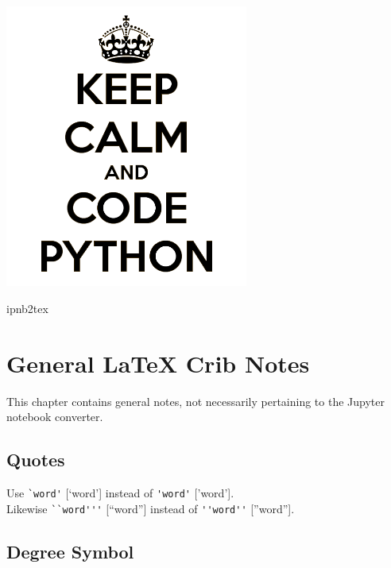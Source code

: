 \documentclass[english]{workpackage}[1996/06/02]
\begin{document}
\WPlayout
\ 
\vspace{50mm}
\begin{center}
\includegraphics[width=0.6\textwidth]{./images/keep-calm-and-code-python_BW.png}
\end{center}
\vspace{5mm}
\begin{center}
{\LARGE  ipnb2tex}
\end{center}

\newpage

\tableofcontents
\listoffigures
\listoftables
\lstlistoflistings

\chapter{General \LaTeX{} Crib Notes}
\label{sec:GeneralLaTeXCribNotes}

This chapter contains general notes, not necessarily pertaining to the Jupyter notebook converter.



\section{Quotes}
\label{sec:Quotes}

Use \verb+`word'+ [`word'] instead of \verb+'word'+ ['word'].\\
Likewise \verb+``word'''+ [``word''] instead of \verb+''word''+ [''word''].
\section{Degree Symbol}
\label{sec:DegreeSymbol}
\end{document}
